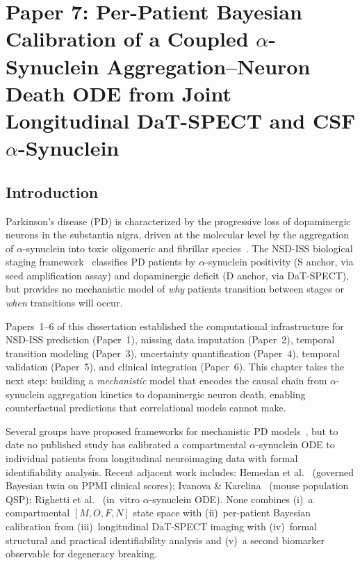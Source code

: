 
\chapter{Paper 7: Per-Patient Bayesian Calibration of a Coupled $\alpha$-Synuclein Aggregation--Neuron Death ODE from Joint Longitudinal DaT-SPECT and CSF $\alpha$-Synuclein}
\label{ch:paper7}

\section{Introduction}
\label{sec:p7-intro}

Parkinson's disease (PD) is characterized by the progressive loss of dopaminergic neurons in the substantia nigra, driven at the molecular level by the aggregation of $\alpha$-synuclein into toxic oligomeric and fibrillar species~\cite{calabresi2023}. The NSD-ISS biological staging framework~\cite{simuni2024} classifies PD patients by $\alpha$-synuclein positivity (S anchor, via seed amplification assay) and dopaminergic deficit (D anchor, via DaT-SPECT), but provides no mechanistic model of \emph{why} patients transition between stages or \emph{when} transitions will occur.

Papers~1--6 of this dissertation established the computational infrastructure for NSD-ISS prediction (Paper~1), missing data imputation (Paper~2), temporal transition modeling (Paper~3), uncertainty quantification (Paper~4), temporal validation (Paper~5), and clinical integration (Paper~6). This chapter takes the next step: building a \emph{mechanistic} model that encodes the causal chain from $\alpha$-synuclein aggregation kinetics to dopaminergic neuron death, enabling counterfactual predictions that correlational models cannot make.

Several groups have proposed frameworks for mechanistic PD models~\cite{denaro2024,bakshi2018}, but to date no published study has calibrated a compartmental $\alpha$-synuclein ODE to individual patients from longitudinal neuroimaging data with formal identifiability analysis. Recent adjacent work includes: Hemedan et al.~\cite{hemedan2026} (governed Bayesian twin on PPMI clinical scores); Ivanova \& Karelina~\cite{ivanova2024} (mouse population QSP); Righetti et al.~\cite{righetti2025} (in~vitro $\alpha$-synuclein ODE). None combines (i)~a compartmental $[M, O, F, N]$ state space with (ii)~per-patient Bayesian calibration from (iii)~longitudinal DaT-SPECT imaging with (iv)~formal structural and practical identifiability analysis and (v)~a second biomarker observable for degeneracy breaking.

